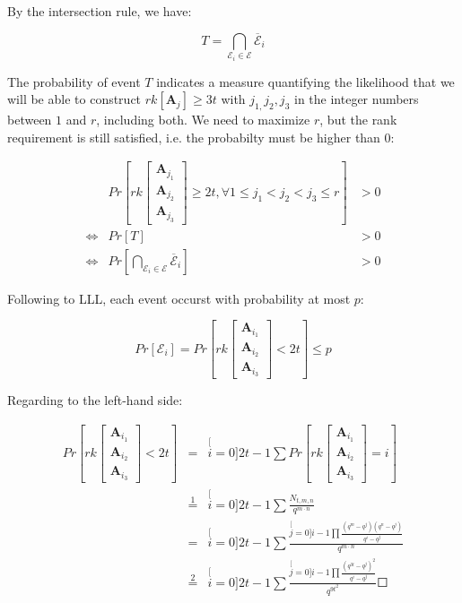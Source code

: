 By the intersection rule, we have:

\[
T=\underset{\mathcal{E}_{i}\in\mathcal{E}}{\bigcap}\overline{\mathcal{E}}_{i}
\]

The probability of event $T$ indicates a measure quantifying the
likelihood that we will be able to construct $rk\left[\boldsymbol{A}_{j}\right]\geq3t$
with $j_{1,}j_{2},j_{3}$ in the integer numbers between $1$ and
$r$, including both. We need to maximize $r$, but the rank requirement
is still satisfied, i.e. the probabilty must be higher than $0$:

\begin{eqnarray*}
 & Pr\left[rk\left[\begin{array}{c}
\boldsymbol{A}_{j_{1}}\\
\boldsymbol{A}_{j_{2}}\\
\boldsymbol{A}_{j_{3}}
\end{array}\right]\geq2t,\forall1\leq j_{1}<j_{2}<j_{3}\leq r\right] & >0\\
\Leftrightarrow & Pr\left[T\right] & >0\\
\Leftrightarrow & Pr\left[\underset{\mathcal{E}_{i}\in\mathcal{E}}{\bigcap}\overline{\mathcal{E}}_{i}\right] & >0
\end{eqnarray*}

Following to LLL, each event occurst with probability at most $p$:

\[
Pr\left[\mathcal{E}_{i}\right]=Pr\left[rk\left[\begin{array}{c}
\boldsymbol{A}_{i_{1}}\\
\boldsymbol{A}_{i_{2}}\\
\boldsymbol{A}_{i_{3}}
\end{array}\right]<2t\right]\leq p
\]

Regarding to the left-hand side:

\begin{eqnarray}
Pr\left[rk\left[\begin{array}{c}
\boldsymbol{A}_{i_{1}}\\
\boldsymbol{A}_{i_{2}}\\
\boldsymbol{A}_{i_{3}}
\end{array}\right]<2t\right] & = & \stackrel[i=0]{2t-1}{\mathop{\sum}}Pr\left[rk\left[\begin{array}{c}
\boldsymbol{A}_{i_{1}}\\
\boldsymbol{A}_{i_{2}}\\
\boldsymbol{A}_{i_{3}}
\end{array}\right]=i\right]\nonumber \\
 & \overset{1}{=} & \stackrel[i=0]{2t-1}{\mathop{\sum}}\frac{N_{t,m,n}}{q^{m\cdot n}}\nonumber \\
 & = & \stackrel[i=0]{2t-1}{\mathop{\sum}}\frac{\stackrel[j=0]{i-1}{\mathop{\prod}}\frac{\left(q^{m}-q^{j}\right)\left(q^{n}-q^{j}\right)}{q^{i}-q^{j}}}{q^{m\cdot n}}\nonumber \\
 & \overset{2}{=} & \stackrel[i=0]{2t-1}{\mathop{\sum}}\frac{\stackrel[j=0]{i-1}{\mathop{\prod}}\frac{\left(q^{3t}-q^{j}\right)^{2}}{q^{i}-q^{j}}}{q^{9t^{2}}}\Square\label{eq:p_eq_h3}
\end{eqnarray}

